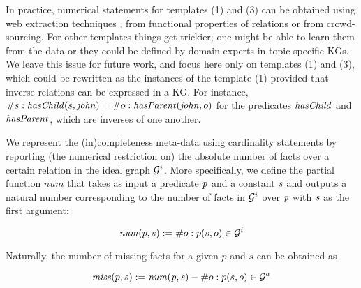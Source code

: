 In practice, numerical statements for templates (1) and (3) can be obtained using web extraction techniques \cite{cardinality-extraction-iswc-2016}, from functional properties of relations or from crowd-sourcing. For other templates things get trickier; one might be able to learn  
them from the data or they could be defined by domain experts in topic-specific KGs. We leave this issue for future work, and focus here only on templates (1) and (3), which could be rewritten as the instances of the template (1) provided that inverse relations can be expressed in a KG. For instance, $\# s: \mathit{hasChild}(s,\mathit{john})=\# o: \mathit{hasParent}(\mathit{john},o)$ for the predicates $\mathit{hasChild}$ and $\mathit{hasParent}$, which are %
inverses of one another. %

We represent the (in)completeness meta-data using cardinality statements by reporting (the numerical restriction on) the absolute number of facts over a certain relation in the ideal graph $\mathcal{G}^i$. More specifically, we define the partial function $num$ that takes as input a predicate $\mathit{p}$ and a constant $\mathit{s}$ and outputs a natural number corresponding to the number of facts in $\mathcal{G}^i$ over $\mathit{p}$ with $\mathit{s}$ as the first argument: 

\begin{equation}\label{eq:num}
\mathit{num}(p,s) := \# o : p(s,o) \in \mathcal{G}^i 
\end{equation}

Naturally, the number of missing facts for a given $p$ and $s$ can be obtained as

\begin{equation}\label{eq:miss}
\mi{miss}(p,s) := \mi{num(p,s)} - \#o : p(s,o) \in \cG^a %
\end{equation}

